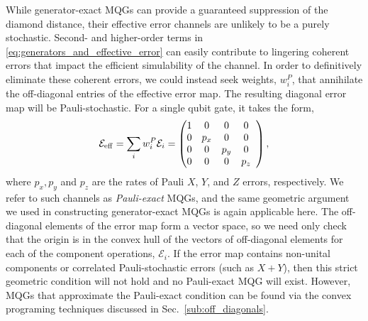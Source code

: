 \documentclass[aps,nofootinbib,pra,notitlepage,twocolumn]{revtex4-1}
\newcommand{\errmat}{\ensuremath{{\mathcal{E}}}}
\newcommand{\0}{\ensuremath{\mathbf{0}}}
\newcommand{\weight}{\ensuremath{w}}
\begin{document}
While generator-exact MQGs can provide a guaranteed suppression of the diamond distance, their effective error channels are unlikely to be a purely stochastic. Second- and higher-order terms in \eqref{eq:generators_and_effective_error} can easily contribute to lingering coherent errors that impact the efficient simulability of the channel. In order to definitively eliminate these coherent errors, we could instead seek weights, $\weight^P_i$, that annihilate the off-diagonal entries of the effective error map. The resulting diagonal error map will be Pauli-stochastic. For a single qubit gate, it takes the form,
\begin{equation}
	\errmat_{\rm{eff}} = \sum_i \weight_i^P \errmat_i = 
	\left(\begin{array}{@{}ccccc@{}}
		1 & 0 & 0 & 0 \\ 
    	0 &  p_x & 0 & 0 \\
		0 & 0 &  p_y & 0\\
		0 & 0 & 0 &  p_z\\
	\end{array} 	
	\right),
\end{equation}
where $p_x, p_y$ and $p_z$ are the rates of Pauli $X$, $Y$, and $Z$ errors, respectively. We refer to such channels as \emph{Pauli-exact} MQGs, and the same geometric argument we used in constructing generator-exact MQGs is again applicable here. The off-diagonal elements of the error map form a vector space, so we need only check that the origin is in the convex hull of the vectors of off-diagonal elements for each of the component operations, $\errmat_i$. If the error map contains non-unital components or correlated Pauli-stochastic errors (such as $X+Y$), then this strict geometric condition will not hold and no Pauli-exact MQG will exist. However, MQGs that approximate the Pauli-exact condition can be found via the convex programing techniques discussed in Sec.~\ref{sub:off_diagonals}.
\end{document}
